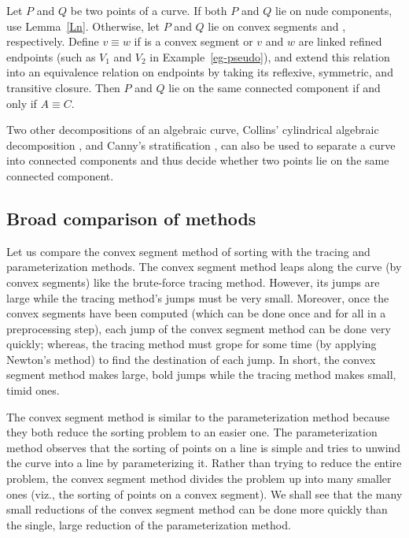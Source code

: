 \begin{lemma}
Let $P$ and $Q$ be two points of a curve.
If both $P$ and $Q$ lie on nude components, use Lemma~{\rm\ref{Ln}}.
Otherwise, let $P$ and $Q$ lie on convex segments  and , 
respectively.
Define $v \equiv w$ if  is a convex segment 
or $v$ and $w$ are linked refined endpoints {\rm (}such as $V_{1}$ and 
$V_{2}$ in 
Example~{\rm\ref{eg-pseudo})}, and extend this relation into an 
equivalence relation 
on endpoints by taking its reflexive, symmetric, and transitive closure.
Then $P$ and $Q$ lie on the same connected component if and only if 
$A \equiv C$.
\end{lemma}

Two other decompositions of an algebraic curve, Collins' 
cylindrical algebraic 
decomposition \cite{Co75}, \cite{arnon83} and Canny's stratification 
\cite{Ca}, 
can also be used to separate a curve into connected components and thus 
decide whether
two points lie on the same connected component.

\subsection{Broad comparison of methods}

Let us compare the convex segment method of sorting with the tracing and 
parameterization methods.
The convex segment method leaps along the curve (by convex segments)
like the brute-force tracing method.
However, its jumps are large while the tracing method's jumps must be 
very small.
Moreover, once the convex segments have
been computed (which can be done once and for all in a preprocessing step),
each jump of the convex segment method can be done very quickly; whereas, 
the tracing
method must grope for some time (by applying Newton's method) to find the 
destination 
of each jump.
In short, the convex segment method 
makes large, bold jumps while the tracing method makes small, timid ones.

The convex segment method is similar to the parameterization method because
they both reduce the sorting problem to an easier one.
The parameterization method observes that the sorting of points 
on a line is simple and tries to unwind the curve into a line by 
parameterizing it.
Rather than trying to reduce the entire problem, the convex segment method 
divides 
the problem up into many smaller ones (viz., the sorting of points on a 
convex 
segment).
We shall see that the many small reductions of the convex segment method
can be done more quickly than the single, large reduction of
the parameterization method.

